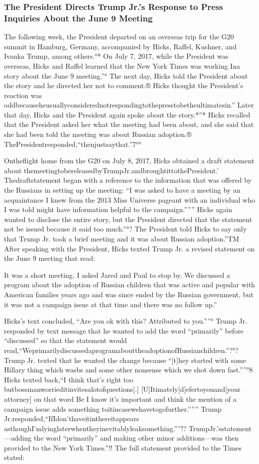 \subsubsection{The President Directs Trump Jr.'s Response to Press Inquiries About the June 9 Meeting}

The following week, the President departed on an overseas trip for the G20 summit in Hamburg, Germany, accompanied by Hicks, Raffel, Kushner, and Ivanka Trump, among others.°*
On July 7, 2017, while the President was overseas, Hicks and Raffel learned that the New York Times was working Ina story about the June 9 meeting.”°
The next day, Hicks told the President about the story and he directed her not to comment.®
Hicks thought the President's reaction was oddbecauseheusuallyconsiderednotrespondingtothepresstobetheultimatesin.”
Later that day, Hicks and the President again spoke about the story.*”*
Hicks recalled that the President asked her what the meeting had been about, and she said that she had been told the meeting was about Russian adoption.® ThePresidentresponded,“thenjustsaythat.”7°°

Ontheflight home from the G20 on July 8, 2017, Hicks obtained a draft statement about themeetingtobereleasedbyTrumpJr.andbroughtittothePresident.'
Thedraftstatement began with a reference to the information that was offered by the Russians in setting up the meeting: “I was asked to have a meeting by an acquaintance I knew from the 2013 Miss Universe pageant with an individual who I was told might have information helpful to the campaign.”””
Hicks again wanted to disclose the entire story, but the President directed that the statement not be
issued because it said too much.”°? The President told Hicks to say only that Trump Jr. took a brief meeting and it was about Russian adoption.”TM
After speaking with the President, Hicks texted Trump Jr. a revised statement on the June 9 meeting that read:

It was a short meeting.
I asked Jared and Paul to stop by.
We discussed a program about the adoption of Russian children that was active and popular with American families years ago and was since ended by the Russian government, but it was not a campaign issue at that time and there was no follow up.”

Hicks's text concluded, “Are you ok with this? Attributed to you.””°
Trump Jr. responded by text message that he wanted to add the word “primarily” before “discussed” so that the statement would read,“WeprimarilydiscussedaprogramabouttheadoptionofRussianchildren.”?°?
Trump Jr. texted that he wanted the change because “[t]hey started with some Hillary thing which wasbs and some other nonsense which we shot down fast.””°8
Hicks texted back,“I think that's right too butbossmanworrieditinvitesalotofquestions[.]
[U]Itimately[d]efertoyouand[your attorney] on that word Be I know it's important and think the mention of a campaign issue adds something toitincasewehavetogofurther.”””
Trump Jr.responded,“IfIdon'thaveitinthereitappears asthoughI'mlyinglaterwhentheyinevitablyleaksomething.””!?
TrumpJr.'sstatement—adding the word “primarily” and making other minor additions—was then provided to the New York Times.”!!
The full statement provided to the Times stated:

